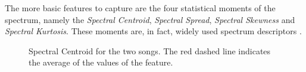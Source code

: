 The more basic features to capture are the four statistical moments of the spectrum, namely the \textit{Spectral Centroid}, \textit{Spectral Spread}, \textit{Spectral Skewness} and \textit{Spectral Kurtosis}. These moments are, in fact, widely used spectrum descriptors \cite{Kim2005,Zanoni2014,Zanoni2012}.

\begin{figure}[t]
	\centering       
	 \hfil
	\caption{Spectral Centroid for the two songs. The red dashed line indicates the average of the values of the feature.}
	\label{fig:LLFs:centroid}          
\end{figure}

